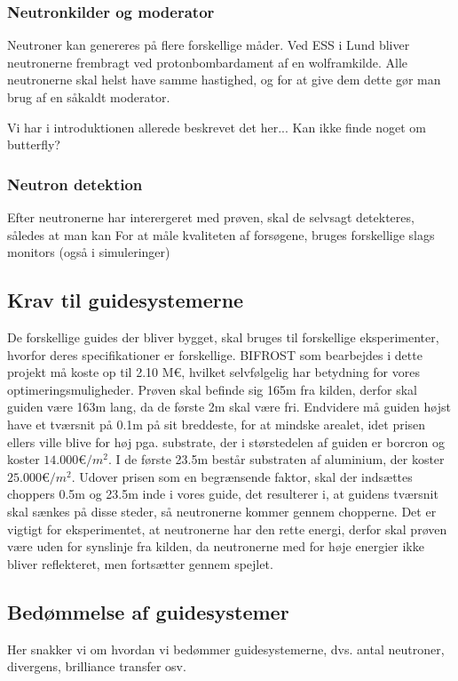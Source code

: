 \documentclass[12pt,oneside,a4paper]{article}
\begin{document}
{{{{{\subsubsection{Neutronkilder og moderator}
Neutroner kan genereres på flere forskellige måder. Ved ESS i Lund bliver neutronerne frembragt ved protonbombardament af en wolframkilde. Alle neutronerne skal helst have samme hastighed, og for at give dem dette gør man brug af en såkaldt moderator.

Vi har i introduktionen allerede beskrevet det her... Kan ikke finde noget om butterfly?
\cite{ess_folder}

\subsubsection{Neutron detektion}
Efter neutronerne har interergeret med prøven, skal de selvsagt detekteres, således at man kan 
For at måle kvaliteten af forsøgene, bruges forskellige slags monitors (også i simuleringer)





\subsection{Krav til guidesystemerne}
De forskellige guides der bliver bygget, skal bruges til forskellige eksperimenter, hvorfor deres specifikationer er forskellige. BIFROST som bearbejdes i dette projekt må koste op til 2.10 M€, hvilket selvfølgelig har betydning for vores optimeringsmuligheder. Prøven skal befinde sig 165m fra kilden, derfor skal guiden være 163m lang, da de første 2m skal være fri. Endvidere må guiden højst have et tværsnit på 0.1m på sit breddeste, for at mindske arealet, idet prisen ellers ville blive for høj pga. substrate, der i størstedelen af guiden er borcron og koster $14.000 \text{€}/m^2$. I de første 23.5m består substraten af aluminium, der koster $25.000 \text{€}/m^2$. Udover prisen som en begrænsende faktor, skal der indsættes choppers 0.5m og 23.5m inde i vores guide, det resulterer i, at guidens tværsnit skal sænkes på disse steder, så neutronerne kommer gennem chopperne. Det er vigtigt for eksperimentet, at neutronerne har den rette energi, derfor skal prøven være uden for synslinje fra kilden, da neutronerne med for høje energier ikke bliver reflekteret, men fortsætter gennem spejlet.

\subsection{Bedømmelse af guidesystemer}
Her snakker vi om hvordan vi bedømmer guidesystemerne, dvs. antal neutroner, divergens, brilliance transfer osv.

}}}}}
\end{document}
